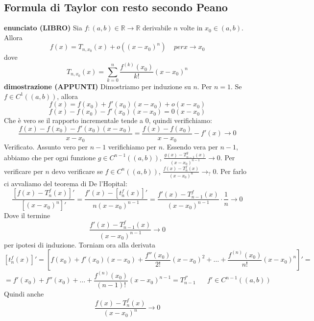 \documentclass[a4paper, 9pt]{report}
\begin{document}
\newpage
\subsection*{Formula di Taylor con resto secondo Peano}
\textbf{enunciato (LIBRO)}\newline
Sia $f: (a,b) \in \mathbb{R} \rightarrow  \mathbb{R}$ derivabile $n$ volte in $x_0 \in (a,b)$. Allora
\[
    f(x) = T_{n,x_0}(x) + o((x-x_0)^n) \;\;\;\; per x \rightarrow x_0
\]
dove
\[
    T_{n,x_0}(x) = \sum_{k=0}^{n}\frac{f^{(k)}(x_0)}{k!}(x-x_0)^n
\]
\textbf{dimostrazione (APPUNTI)}\newline
Dimostriamo per induzione su $n$. \newline
Per $n=1$. Se $f \in C^1((a,b))$, allora
\[
    f(x) = f(x_0) + f'(x_0)(x-x_0) + o (x-x_0)
\]
\[
    f(x) - f(x_0) - f'(x_0)(x-x_0) = 0(x-x_0)
\]
Che è vero se il rapporto incrementale tende a $0$, quindi verifichiamo:
\[
    \frac{f(x)-f(x_0)-f'(x_0)(x-x_0)}{x-x_0} = \frac{f(x)- f(x_0)}{x-x_0} - f'(x) \rightarrow 0
\]
Verificato.\newline
Assunto vero per $n-1$ verifichiamo per $n$. \newline
Essendo vera per $n-1$, abbiamo che per ogni funzione $g \in C^{n-1}((a,b))$, $\frac{g(x) - T_{n-1}^g(x)}{(x-x_0)^{n-1}} \rightarrow 0$. Per verificare per $n$ devo verificare se $f \in C^n((a,b))$, $\frac{f(x)-T_n^f(x)}{(x-x_0)^n} \rightarrow_? 0$. Per farlo ci avvaliamo del teorema di De l'Hopital:
\[
    \frac{[f(x) - T_n^f(x)]'}{[(x-x_0)^n]'} = \frac{f'(x)- [t_n^f(x)]'}{n(x-x_0)^{n-1}} = \frac{f'(x)-T_{n-1}^f(x)}{(x-x_0)^{n-1}} \cdot \frac{1}{n} \rightarrow 0
\]
Dove il termine 
\[
    \frac{f'(x)-T_{n-1}^f(x)}{(x-x_0)^{n-1}} \rightarrow 0
\]
per ipotesi di induzione.\newline
Torniam ora alla derivata
\[
    [t_n^f(x)]' = \left[f(x_0) + f'(x_0)(x-x_0) + \frac{f''(x_0)}{2!}(x-x_0)^2 + \dots + \frac{f^{(n)}(x_0)}{n!}(x-x_0)^n\right]'=
\]
\[
    =f'(x_0) + f''(x_0) + \dots + \frac{f^{(n)}(x_0)}{(n-1)!}(x-x_0)^{n-1} = T_{n-1}^{f'} \;\;\;\;\;\;f' \in C^{n-1}((a,b))
\]
Quindi anche 
\[
    \frac{f(x)-T_n^f(x)}{(x-x_0)^n} \rightarrow 0
\]






\newpage
\end{document}
